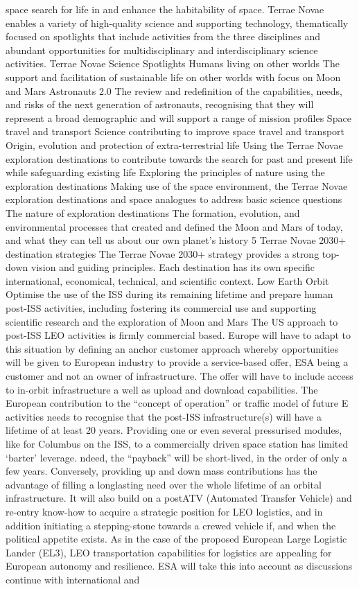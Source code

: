 \documentclass[12pt]{article}
\begin{document}
space search for life in and enhance the habitability of space. Terrae Novae enables a variety of high-quality science and supporting technology, thematically focused on spotlights that include activities from the three disciplines and abundant opportunities for multidisciplinary and interdisciplinary science activities. Terrae Novae Science Spotlights Humans living on other worlds The support and facilitation of sustainable life on other worlds with focus on Moon and Mars Astronauts 2.0 The review and redefinition of the capabilities, needs, and risks of the next generation of astronauts, recognising that they will represent a broad demographic and will support a range of mission profiles Space travel and transport Science contributing to improve space travel and transport Origin, evolution and protection of extra-terrestrial life Using the Terrae Novae exploration destinations to contribute towards the search for past and present life while safeguarding existing life Exploring the principles of nature using the exploration destinations Making use of the space environment, the Terrae Novae exploration destinations and space analogues to address basic science questions The nature of exploration destinations The formation, evolution, and environmental processes that created and defined the Moon and Mars of today, and what they can tell us about our own planet’s history 5 Terrae Novae 2030+ destination strategies The Terrae Novae 2030+ strategy provides a strong top-down vision and guiding principles. Each destination has its own specific international, economical, technical, and scientific context. Low Earth Orbit Optimise the use of the ISS during its remaining lifetime and prepare human post-ISS activities, including fostering its commercial use and supporting scientific research and the exploration of Moon and Mars The US approach to post-ISS LEO activities is firmly commercial based. Europe will have to adapt to this situation by defining an anchor customer approach whereby opportunities will be given to European industry to provide a service-based offer, ESA being a customer and not an owner of infrastructure. The offer will have to include access to in-orbit infrastructure a well as upload and download capabilities. The European contribution to the “concept of operation” or traffic model of future E activities needs to recognise that the post-ISS infrastructure(s) will have a lifetime of at least 20 years. Providing one or even several pressurised modules, like for Columbus on the ISS, to a commercially driven space station has limited ‘barter’ leverage. ndeed, the “payback” will be short-lived, in the order of only a few years. Conversely, providing up and down mass contributions has the advantage of filling a longlasting need over the whole lifetime of an orbital infrastructure. It will also build on a postATV (Automated Transfer Vehicle) and re-entry know-how to acquire a strategic position for LEO logistics, and in addition initiating a stepping-stone towards a crewed vehicle if, and when the political appetite exists. As in the case of the proposed European Large Logistic Lander (EL3), LEO transportation capabilities for logistics are appealing for European autonomy and resilience. ESA will take this into account as discussions continue with international and 
\end{document}

